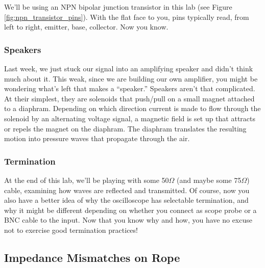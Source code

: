 \documentclass[11pt]{article}
\begin{document}
We'll be using an NPN bipolar junction transistor in this lab (see Figure \ref{fig:npn_transistor_pins}).  With
the flat face to you, pins typically read, from left to right, emitter, base, collector.  Now you know.

\subsubsection*{Speakers}

Last week, we just stuck our signal into an amplifying speaker and didn't think much about it.  This weak, since we are building our own amplifier, you might be wondering what's left that makes a ``speaker.''  Speakers aren't
that complicated.  At their simplest, they are solenoids that push/pull on a small magnet
attached to a diaphram.  Depending on which direction current is made to flow through the solenoid by an
alternating voltage signal, a magnetic field is set up that attracts or repels the magnet on the diaphram.  The
diaphram translates the resulting motion into pressure waves that propagate through the air.

\subsubsection*{Termination}

At the end of this lab, we'll be playing with some 50$\Omega$ (and maybe some 75$\Omega$) cable, examining how
waves are reflected and transmitted.  Of course, now you also have a better idea of why the oscilloscope
has selectable termination, and why it might be different depending on whether you connect as scope probe
or a BNC cable to the input.  Now that you know why and how, you have no excuse not to exercise good termination
practices!

\subsection{Impedance Mismatches on Rope}
\end{document}
